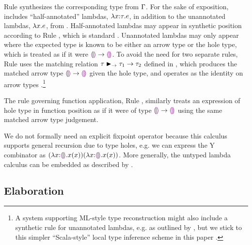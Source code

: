 Rule  synthesizes the corresponding type from $\Gamma$.
For the sake of exposition, \HazelnutLive includes ``half-annotated'' lambdas, $\lambda x{:}\tau.e$, in addition to the unannotated lambdas, $\lambda x.e$, from \Hazelnut.
%
Half-annotated lambdas may appear in synthetic position according to Rule , which is standard \cite{Chlipala:2005da}.
%
Unannotated lambdas may only appear where the expected type is known to be either an arrow type or the hole type, which is treated as if it were $\textcolor{violet}{\llparenthesis}\textcolor{violet}{\rrparenthesis} \rightarrow \textcolor{violet}{\llparenthesis}\textcolor{violet}{\rrparenthesis}$.
%
To avoid the need for two separate rules, Rule  uses the matching relation $\tau \blacktriangleright_{\rightarrow} \tau_1 \rightarrow \tau_2$ defined in , which produces the matched arrow type $\textcolor{violet}{\llparenthesis}\textcolor{violet}{\rrparenthesis} \rightarrow \textcolor{violet}{\llparenthesis}\textcolor{violet}{\rrparenthesis}$ given the hole type, and operates as the identity on arrow types \cite{DBLP:conf/snapl/SiekVCB15,DBLP:conf/popl/GarciaC15}.\footnote{A system supporting ML-style type reconstruction \cite{damas1982principal} might also include a synthetic rule for unannotated lambdas, e.g. as outlined by \citet{DBLP:conf/icfp/DunfieldK13}, but we stick to this simpler ``Scala-style'' local type inference scheme in this paper \cite{Pierce:2000ve,Odersky:2001lb}.}
%
%
%
%

The rule governing function application, Rule , similarly treats an expression of hole type in function position as if it were of type $\textcolor{violet}{\llparenthesis}\textcolor{violet}{\rrparenthesis} \rightarrow \textcolor{violet}{\llparenthesis}\textcolor{violet}{\rrparenthesis}$ using the same matched arrow type judgement.

We do not formally need an explicit fixpoint operator because this calculus supports general recursion due to type holes, e.g. we can express the Y combinator as $(\lambda x{:}\textcolor{violet}{\llparenthesis}\textcolor{violet}{\rrparenthesis}.x(x)) (\lambda x{:}\textcolor{violet}{\llparenthesis}\textcolor{violet}{\rrparenthesis}.x(x))$. More generally, the untyped lambda calculus can be embedded as described by \citet{Siek06a}.

\vspace{-4px}
\subsection{Elaboration}
\label{sec:elaboration}
\vspace{-1px}

